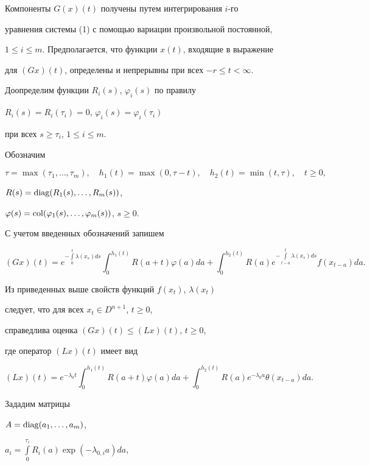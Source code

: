 Компоненты $G(x)(t)$ получены путем интегрирования $i$-го


уравнения системы (1) с помощью вариации произвольной постоянной,


$1\le i \le m$. Предполагается, что функции $x(t)$, входящие в выражение


для $(Gx)(t)$, определены и непрерывны при всех $-r\le t<\infty$.


Доопределим функции $R_i(s)$, $\varphi_i(s)$ по правилу


$R_i(s) = R_i(\tau_i)=0$, $\varphi_i(s)=\varphi_i(\tau_i)$


при всех $s \ge\tau_i$, $1 \le i \le m$.


Обозначим


$$


\tau=\max(\tau_1,\dotsc,\tau_m), \quad


h_1(t) = \max(0,\tau -t), \quad h_2(t) = \min(t,\tau), \quad t \ge 0,


$$


$R(s)=\operatorname{diag}(R_1(s),\dotsc,R_m(s))$,


$\varphi(s) =


\col(\varphi_1(s),\dotsc,\varphi_m(s))$, $s \ge 0$.


С учетом введенных обозначений запишем


$$


(Gx)(t) = e^{-\int\limits_0^t\lambda(x_s)ds}\int_0^{h_1(t)}


R(a+t)\varphi (a)da + \int_0^{h_2(t)}R(a)e^{-\int\limits_{t-a}^t


\lambda(x_s)ds}f(x_{t-a})da.


$$


Из приведенных выше свойств функций $f(x_t)$, $\lambda(x_t)$


следует, что для всех $x_t\in D^{n+1}$, $t \ge 0$,


справедлива оценка $(Gx)(t)\le (Lx)(t)$, $t \ge 0$,


где оператор $(Lx)(t)$ имеет вид


$$


(Lx)(t)=e^{-\lambda_0 t}\int_0^{h_1(t)}R(a+t)\varphi (a)da +


\int_0^{h_2(t)}R(a)e^{-\lambda_0 a}\theta (x_{t-a})da.


$$


Зададим матрицы


$A=\operatorname{diag}(a_1,\dotsc,a_m)$,


$a_i=\int\limits_0^{\tau_i}R_i(a)\exp(-\lambda_{0,i}a)da$,



